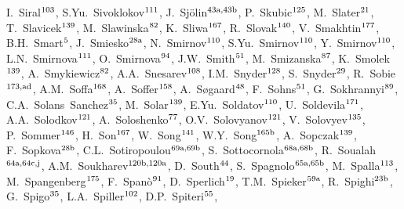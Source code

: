 \begin{flushleft}
I.~Siral$^\textrm{\scriptsize 103}$,    
S.Yu.~Sivoklokov$^\textrm{\scriptsize 111}$,    
J.~Sj\"{o}lin$^\textrm{\scriptsize 43a,43b}$,    
P.~Skubic$^\textrm{\scriptsize 125}$,    
M.~Slater$^\textrm{\scriptsize 21}$,    
T.~Slavicek$^\textrm{\scriptsize 139}$,    
M.~Slawinska$^\textrm{\scriptsize 82}$,    
K.~Sliwa$^\textrm{\scriptsize 167}$,    
R.~Slovak$^\textrm{\scriptsize 140}$,    
V.~Smakhtin$^\textrm{\scriptsize 177}$,    
B.H.~Smart$^\textrm{\scriptsize 5}$,    
J.~Smiesko$^\textrm{\scriptsize 28a}$,    
N.~Smirnov$^\textrm{\scriptsize 110}$,    
S.Yu.~Smirnov$^\textrm{\scriptsize 110}$,    
Y.~Smirnov$^\textrm{\scriptsize 110}$,    
L.N.~Smirnova$^\textrm{\scriptsize 111}$,    
O.~Smirnova$^\textrm{\scriptsize 94}$,    
J.W.~Smith$^\textrm{\scriptsize 51}$,    
M.~Smizanska$^\textrm{\scriptsize 87}$,    
K.~Smolek$^\textrm{\scriptsize 139}$,    
A.~Smykiewicz$^\textrm{\scriptsize 82}$,    
A.A.~Snesarev$^\textrm{\scriptsize 108}$,    
I.M.~Snyder$^\textrm{\scriptsize 128}$,    
S.~Snyder$^\textrm{\scriptsize 29}$,    
R.~Sobie$^\textrm{\scriptsize 173,ad}$,    
A.M.~Soffa$^\textrm{\scriptsize 168}$,    
A.~Soffer$^\textrm{\scriptsize 158}$,    
A.~S{\o}gaard$^\textrm{\scriptsize 48}$,    
F.~Sohns$^\textrm{\scriptsize 51}$,    
G.~Sokhrannyi$^\textrm{\scriptsize 89}$,    
C.A.~Solans~Sanchez$^\textrm{\scriptsize 35}$,    
M.~Solar$^\textrm{\scriptsize 139}$,    
E.Yu.~Soldatov$^\textrm{\scriptsize 110}$,    
U.~Soldevila$^\textrm{\scriptsize 171}$,    
A.A.~Solodkov$^\textrm{\scriptsize 121}$,    
A.~Soloshenko$^\textrm{\scriptsize 77}$,    
O.V.~Solovyanov$^\textrm{\scriptsize 121}$,    
V.~Solovyev$^\textrm{\scriptsize 135}$,    
P.~Sommer$^\textrm{\scriptsize 146}$,    
H.~Son$^\textrm{\scriptsize 167}$,    
W.~Song$^\textrm{\scriptsize 141}$,    
W.Y.~Song$^\textrm{\scriptsize 165b}$,    
A.~Sopczak$^\textrm{\scriptsize 139}$,    
F.~Sopkova$^\textrm{\scriptsize 28b}$,    
C.L.~Sotiropoulou$^\textrm{\scriptsize 69a,69b}$,    
S.~Sottocornola$^\textrm{\scriptsize 68a,68b}$,    
R.~Soualah$^\textrm{\scriptsize 64a,64c,j}$,    
A.M.~Soukharev$^\textrm{\scriptsize 120b,120a}$,    
D.~South$^\textrm{\scriptsize 44}$,    
S.~Spagnolo$^\textrm{\scriptsize 65a,65b}$,    
M.~Spalla$^\textrm{\scriptsize 113}$,    
M.~Spangenberg$^\textrm{\scriptsize 175}$,    
F.~Span\`o$^\textrm{\scriptsize 91}$,    
D.~Sperlich$^\textrm{\scriptsize 19}$,    
T.M.~Spieker$^\textrm{\scriptsize 59a}$,    
R.~Spighi$^\textrm{\scriptsize 23b}$,    
G.~Spigo$^\textrm{\scriptsize 35}$,    
L.A.~Spiller$^\textrm{\scriptsize 102}$,    
D.P.~Spiteri$^\textrm{\scriptsize 55}$,    

\end{flushleft}

